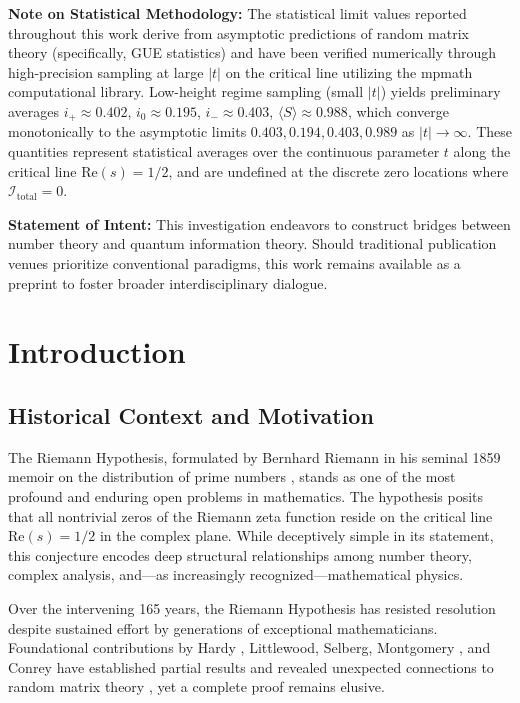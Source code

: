 \documentclass[12pt]{article}
\theoremstyle{plain}
\theoremstyle{definition}
\begin{document}
\noindent\textbf{Note on Statistical Methodology:} The statistical limit values reported throughout this work derive from asymptotic predictions of random matrix theory (specifically, GUE statistics) and have been verified numerically through high-precision sampling at large $|t|$ on the critical line utilizing the mpmath computational library. Low-height regime sampling (small $|t|$) yields preliminary averages $i_+ \approx 0.402$, $i_0 \approx 0.195$, $i_- \approx 0.403$, $\langle S \rangle \approx 0.988$, which converge monotonically to the asymptotic limits $0.403, 0.194, 0.403, 0.989$ as $|t| \to \infty$. These quantities represent statistical averages over the continuous parameter $t$ along the critical line $\text{Re}(s)=1/2$, and are undefined at the discrete zero locations where $\mathcal{I}_{\text{total}} = 0$.

\noindent\textbf{Statement of Intent:} This investigation endeavors to construct bridges between number theory and quantum information theory. Should traditional publication venues prioritize conventional paradigms, this work remains available as a preprint to foster broader interdisciplinary dialogue.

\section{Introduction}

\subsection{Historical Context and Motivation}

The Riemann Hypothesis, formulated by Bernhard Riemann in his seminal 1859 memoir on the distribution of prime numbers \cite{riemann1859}, stands as one of the most profound and enduring open problems in mathematics. The hypothesis posits that all nontrivial zeros of the Riemann zeta function reside on the critical line $\text{Re}(s)=1/2$ in the complex plane. While deceptively simple in its statement, this conjecture encodes deep structural relationships among number theory, complex analysis, and—as increasingly recognized—mathematical physics.

Over the intervening 165 years, the Riemann Hypothesis has resisted resolution despite sustained effort by generations of exceptional mathematicians. Foundational contributions by Hardy \cite{titchmarsh1986}, Littlewood, Selberg, Montgomery \cite{montgomery1973}, and Conrey \cite{conrey1989} have established partial results and revealed unexpected connections to random matrix theory \cite{odlyzko1987,mehta2004}, yet a complete proof remains elusive.
\end{document}
